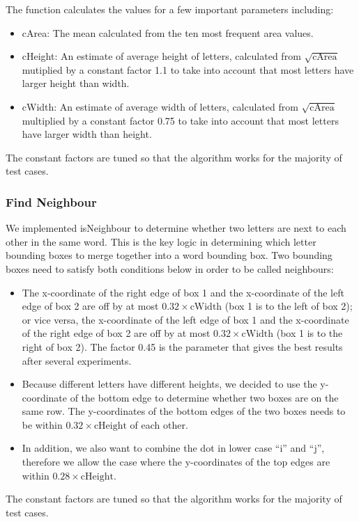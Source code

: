 \documentclass[conference]{IEEEtran}
\begin{document}
The function calculates the values for a few important parameters including:
\begin{itemize}
\item cArea: The mean calculated from the ten most frequent area values.
\item cHeight: An estimate of average height of letters, calculated from $\sqrt{\mbox{cArea}}$ mutiplied by a constant factor 1.1 to take into account that most letters have larger height than width.
\item cWidth: An estimate of average width of letters, calculated from $\sqrt{\mbox{cArea}}$ multiplied by a constant factor 0.75 to take into account that most letters have larger width than height.
\end{itemize}
The constant factors are tuned so that the algorithm works for the majority of test cases.

\subsubsection{Find Neighbour}
We implemented isNeighbour to determine whether two letters are next to each other in the same word.  This is the key logic in determining which letter bounding boxes to merge together into a word bounding box.  Two bounding boxes need to satisfy both conditions below in order to be called neighbours:
\begin{itemize}
\item The x-coordinate of the right edge of box 1 and the x-coordinate of the left edge of box 2 are off by at most $0.32 \times \mbox{cWidth}$ (box 1 is to the left of box 2); or vice versa, the x-coordinate of the left edge of box 1 and the x-coordinate of the right edge of box 2 are off by at most $0.32 \times \mbox{cWidth}$ (box 1 is to the right of box 2).  The factor 0.45 is the parameter that gives the best results after several experiments.
\item  Because different letters have different heights, we decided to use the y-coordinate of the bottom edge to determine whether two boxes are on the same row.  The y-coordinates of the bottom edges of the two boxes needs to be within $0.32 \times \mbox{cHeight}$ of each other.
\item  In addition, we also want to combine the dot in lower case ``i'' and ``j'', therefore we allow the case where the y-coordinates of the top edges are within $0.28 \times \mbox{cHeight}$.
\end{itemize}
The constant factors are tuned so that the algorithm works for the majority of test cases.
\end{document}
